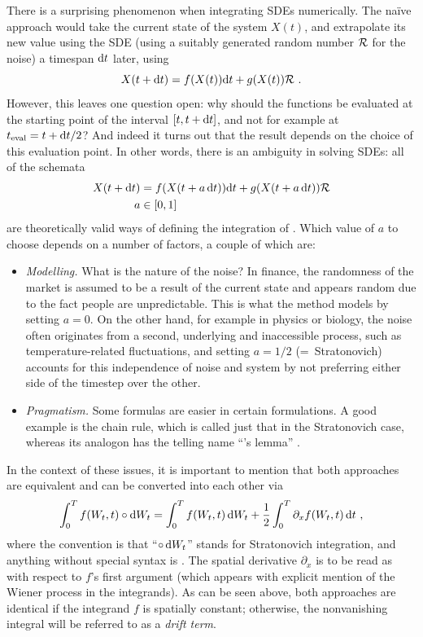 There is a surprising phenomenon when integrating SDEs numerically. The na\"ive approach would take the current state of the system \(X(t)\), and extrapolate its new value using the SDE (using a suitably generated random number \(\mathcal{R}\) for the noise) a timespan \(\mathrm{d} t\) later, using
%
\begin{equation}
	X(t+\mathrm{d} t) = f(X(t))\mathrm{d} t + g(X(t)) \mathcal{R} ~.
\end{equation}
%
However, this leaves one question open: why should the functions be evaluated at the starting point of the interval \([t,t+\mathrm{d} t]\), and not for example at \(t_\text{eval} = t+\mathrm{d} t/2\)? And indeed it turns out that the result depends on the choice of this evaluation point. In other words, there is an ambiguity in solving SDEs: all of the schemata
%
\begin{align}
	X(t+\mathrm{d} t) &= f(X(t+a\,\mathrm{d} t))\mathrm{d} t + g(X(t+a\,\mathrm{d} t)) \mathcal{R} \\
	a &\in [0,1]
\end{align}
%
are theoretically valid ways of defining the integration of . Which value of \(a\) to choose depends on a number of factors, a couple of which are:
%
\begin{itemize}
	\item \emph{Modelling.} What is the nature of the noise? In finance, the randomness of the market is assumed to be a result of the current state and appears random due to the fact people are unpredictable. This is what the \Ito{} method models by setting \(a = 0\). On the other hand, for example in physics or biology, the noise often originates from a second, underlying and inaccessible process, such as temperature-related fluctuations, and setting \(a = 1/2\) (=~Stratonovich) accounts for this independence of noise and system by not preferring either side of the timestep over the other.
	\item \emph{Pragmatism.} Some formulas are easier in certain formulations. A good example is the chain rule, which is called just that in the Stratonovich case, whereas its analogon has the telling name ``\Ito{}'s lemma'' \cite{sde}.
\end{itemize}
%
In the context of these issues, it is important to mention that both approaches are equivalent and can be converted into each other via
%
\begin{equation}
	\int_0^Tf(W_t,t)\circ\mathrm{d} W_t
	=
	\int_0^Tf(W_t,t)\,\mathrm{d} W_t
	+
	\frac12\int_0^T \partial_xf(W_t,t)\,\mathrm{d} t ~,
\end{equation}
%
where the convention is that ``\(\circ\,\mathrm{d} W_t\)'' stands for Stratonovich integration, and anything without special syntax is \Ito{}. The spatial derivative \(\partial_x\) is to be read as with respect to \(f\)'s first argument (which appears with explicit mention of the Wiener process in the integrands). As can be seen above, both approaches are identical if the integrand \(f\) is spatially constant; otherwise, the nonvanishing integral will be referred to as a \emph{drift term}.


